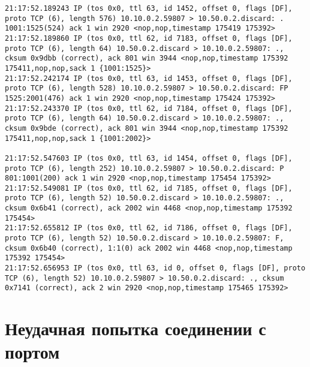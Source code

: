 \documentclass[a4paper,12pt]{article}
\begin{document}
\begin{lstlisting}
21:17:52.189243 IP (tos 0x0, ttl 63, id 1452, offset 0, flags [DF], proto TCP (6), length 576) 10.10.0.2.59807 > 10.50.0.2.discard: . 1001:1525(524) ack 1 win 2920 <nop,nop,timestamp 175419 175392>
21:17:52.189860 IP (tos 0x0, ttl 62, id 7183, offset 0, flags [DF], proto TCP (6), length 64) 10.50.0.2.discard > 10.10.0.2.59807: ., cksum 0x9dbb (correct), ack 801 win 3944 <nop,nop,timestamp 175392 175411,nop,nop,sack 1 {1001:1525}>
21:17:52.242174 IP (tos 0x0, ttl 63, id 1453, offset 0, flags [DF], proto TCP (6), length 528) 10.10.0.2.59807 > 10.50.0.2.discard: FP 1525:2001(476) ack 1 win 2920 <nop,nop,timestamp 175424 175392>
21:17:52.243370 IP (tos 0x0, ttl 62, id 7184, offset 0, flags [DF], proto TCP (6), length 64) 10.50.0.2.discard > 10.10.0.2.59807: ., cksum 0x9bde (correct), ack 801 win 3944 <nop,nop,timestamp 175392 175411,nop,nop,sack 1 {1001:2002}>

21:17:52.547603 IP (tos 0x0, ttl 63, id 1454, offset 0, flags [DF], proto TCP (6), length 252) 10.10.0.2.59807 > 10.50.0.2.discard: P 801:1001(200) ack 1 win 2920 <nop,nop,timestamp 175454 175392>
21:17:52.549081 IP (tos 0x0, ttl 62, id 7185, offset 0, flags [DF], proto TCP (6), length 52) 10.50.0.2.discard > 10.10.0.2.59807: ., cksum 0x6b41 (correct), ack 2002 win 4468 <nop,nop,timestamp 175392 175454>
21:17:52.655812 IP (tos 0x0, ttl 62, id 7186, offset 0, flags [DF], proto TCP (6), length 52) 10.50.0.2.discard > 10.10.0.2.59807: F, cksum 0x6b40 (correct), 1:1(0) ack 2002 win 4468 <nop,nop,timestamp 175392 175454>
21:17:52.656953 IP (tos 0x0, ttl 63, id 0, offset 0, flags [DF], proto TCP (6), length 52) 10.10.0.2.59807 > 10.50.0.2.discard: ., cksum 0x7141 (correct), ack 2 win 2920 <nop,nop,timestamp 175465 175392>
\end{lstlisting}

\section{Неудачная попытка соединении с портом}
\end{document}
